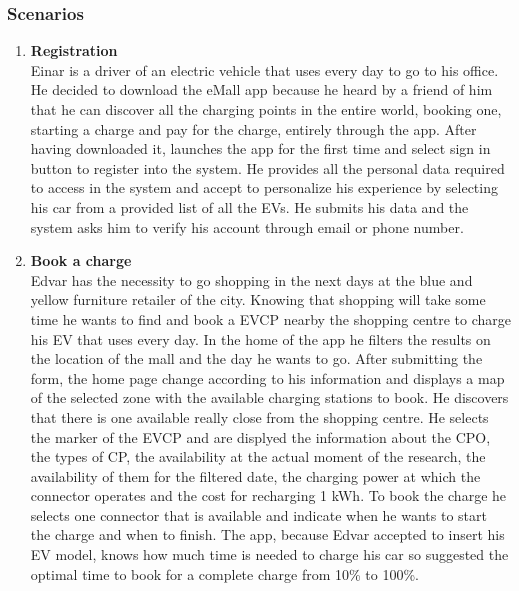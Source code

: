 \subsubsection{Scenarios}
\begin{enumerate}[label=\textbf{\Alph*}.]
      \item \textbf{Registration} \\
            Einar is a driver of an electric vehicle that uses every day to go to his
            office. He decided to download the eMall app because he heard by a friend
            of him that he can discover all the charging points in the entire world,
            booking one, starting a charge and pay for the charge, entirely through
            the app. After having downloaded it, launches the app for the first time
            and select sign in button to register into the system. He provides all
            the personal data required to access in the system and accept to personalize
            his experience by selecting his car from a provided list of all the EVs.
            He submits his data and the system asks him to verify his account through email or phone number.
      \item \textbf{Book a charge} \\
            Edvar has the necessity to go shopping in the next days at the blue and yellow furniture retailer of the city. Knowing
            that shopping will take some time he wants to find and book a EVCP nearby the shopping centre to charge his EV that uses every day.
            In the home of the app he filters the results on the location of the mall and the day he wants to go.
            After submitting the form, the home page change according to his information and displays
            a map of the selected zone with the available charging stations to book. He discovers that there is one available
            really close from the shopping centre. He selects the marker of the EVCP and are displyed the information about the CPO,
            the types of CP, the availability at the actual moment of the research, the availability of them for the filtered date,
            the charging power at which the connector operates and the cost for recharging 1 kWh.
            To book the charge he selects one connector that is available and indicate when he wants to start the charge
            and when to finish. The app, because Edvar accepted to insert his EV model, knows how much time is needed to charge his car so suggested
            the optimal time to book for a complete charge from 10\% to 100\%.

\end{enumerate}
